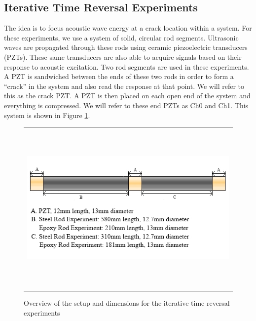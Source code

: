 \documentclass[a4paper]{spie}  %
\begin{document}
\subsection{Iterative Time Reversal Experiments}
The idea is to focus acoustic wave energy at a crack location within a system. For these experiments, we use a system of solid, circular rod segments. Ultrasonic waves are propagated through these rods using ceramic piezoelectric transducers (PZTs). These same transducers are also able to acquire signals based on their response to acoustic excitation. Two rod segments are used in these experiments. A PZT is sandwiched between the ends of these two rods in order to form a ``crack'' in the system and also read the response at that point. We will refer to this as the crack PZT. A PZT is then placed on each open end of the system and everything is compressed. We will refer to these end PZTs as Ch0 and Ch1. This system is shown in Figure \ref{fig:steel_rods}.

\begin{figure}[h!]
\begin{center}
\begin{tabular}{c}
\includegraphics[height=8.5cm]{steel_rods}
\end{tabular}
\end{center}
\caption[example] 
{ \label{fig:steel_rods} 
   Overview of the setup and dimensions for the iterative time reversal experiments}
\end{figure} 
\end{document}
